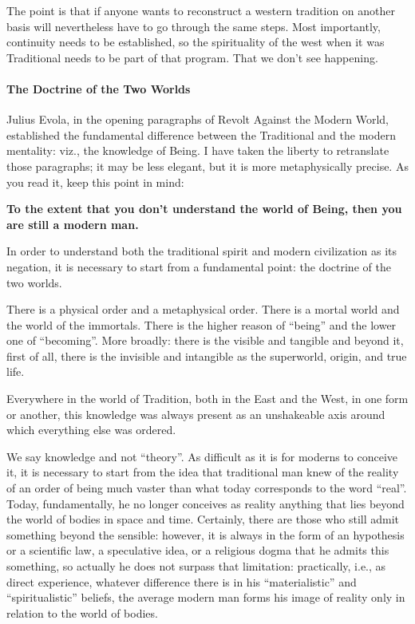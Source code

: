 The point is that if anyone wants to reconstruct a western tradition on another basis will nevertheless have to go through the same steps. Most importantly, continuity needs to be established, so the spirituality of the west when it was Traditional needs to be part of that program. That we don't see happening.

\paragraph{The Doctrine of the Two Worlds}


Julius Evola, in the opening paragraphs of Revolt Against the Modern World, established the fundamental difference between the Traditional and the modern mentality: viz., the knowledge of Being. I have taken the liberty to retranslate those paragraphs; it may be less elegant, but it is more metaphysically precise. As you read it, keep this point in mind:

\textbf{To the extent that you don't understand the world of Being, then you are still a modern man.}

\begin{quotationx}
In order to understand both the traditional spirit and modern civilization as its negation, it is necessary to start from a fundamental point: the doctrine of the two worlds.

There is a physical order and a metaphysical order. There is a mortal world and the world of the immortals. There is the higher reason of ``being'' and the lower one of ``becoming''. More broadly: there is the visible and tangible and beyond it, first of all, there is the invisible and intangible as the superworld, origin, and true life.

Everywhere in the world of Tradition, both in the East and the West, in one form or another, this knowledge was always present as an unshakeable axis around which everything else was ordered.

We say knowledge and not ``theory''. As difficult as it is for moderns to conceive it, it is necessary to start from the idea that traditional man knew of the reality of an order of being much vaster than what today corresponds to the word ``real''. Today, fundamentally, he no longer conceives as reality anything that lies beyond the world of bodies in space and time. Certainly, there are those who still admit something beyond the sensible: however, it is always in the form of an hypothesis or a scientific law, a speculative idea, or a religious dogma that he admits this something, so actually he does not surpass that limitation: practically, i.e., as direct experience, whatever difference there is in his ``materialistic'' and ``spiritualistic'' beliefs, the average modern man forms his image of reality only in relation to the world of bodies.
\end{quotationx}


